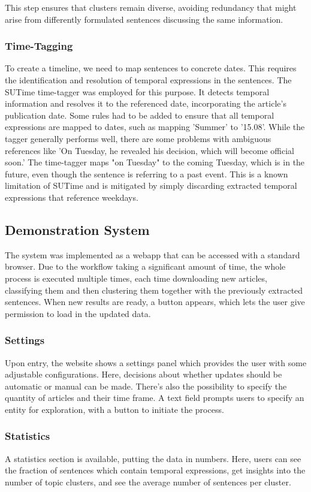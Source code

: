 \documentclass[10pt,twocolumn]{article}
\begin{document}
This step ensures that clusters remain diverse, avoiding redundancy that might arise from differently formulated sentences discussing the same information.

\subsubsection{Time-Tagging}
To create a timeline, we need to map sentences to concrete dates. This requires the identification and resolution of temporal expressions in the sentences. The SUTime time-tagger \cite{sutime} was employed for this purpose. It detects temporal information and resolves it to the referenced date, incorporating the article's publication date.
Some rules had to be added to ensure that all temporal expressions are mapped to dates, such as mapping 'Summer' to '15.08'.
While the tagger generally performs well, there are some problems with ambiguous references like 'On Tuesday, he revealed his decision, which will become official soon.'
The time-tagger maps "on Tuesday" to the coming Tuesday, which is in the future, even though the sentence is referring to a past event. This is a known limitation of SUTime and is mitigated by simply discarding extracted temporal expressions that reference weekdays.

\subsection{Demonstration System}
The system was implemented as a webapp that can be accessed with a standard browser. Due to the workflow taking a significant amount of time, the whole process is executed multiple times, each time downloading new articles, classifying them and then clustering them together with the previously extracted sentences. When new results are ready, a button appears, which lets the user give permission to load in the updated data.

\subsubsection{Settings}
Upon entry, the website shows a settings panel which provides the user with some adjustable configurations. Here, decisions about whether updates should be automatic or manual can be made. There's also the possibility to specify the quantity of articles and their time frame. A text field prompts users to specify an entity for exploration, with a button to initiate the process.

\subsubsection{Statistics}
A statistics section is available, putting the data in numbers. Here, users can see the fraction of sentences which contain temporal expressions, get insights into the number of topic clusters, and see the average number of sentences per cluster.
\end{document}

